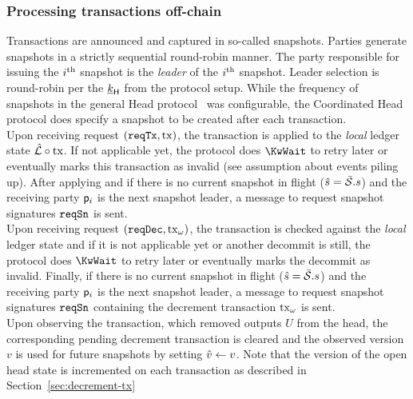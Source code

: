 \subsubsection{Processing transactions off-chain}

Transactions are announced and captured in so-called snapshots. Parties generate
snapshots in a strictly sequential round-robin manner. The party responsible for
issuing the $i^{\text{th}}$ snapshot is the \emph{leader} of the $i^{\text{th}}$ snapshot.
Leader selection is round-robin per the $\underline{k}_{\mathsf{H}}$ from the protocol setup.
While the frequency of snapshots in the general Head protocol~\cite{hydrahead20}
was configurable, the Coordinated Head protocol does specify a snapshot to be
created after each transaction.\\

\quad Upon receiving request $(\mathtt{reqTx},\mathrm{tx})$, the transaction is
applied to the \emph{local} ledger state $\hat {\mathcal L} \circ \mathrm{tx}$. If not
applicable yet, the protocol does $\KwWait$ to retry later or eventually marks
this transaction as invalid (see assumption about events piling up). After
applying and if there is no current snapshot in flight ($\hat s = \bar{\mathcal S}.s$) and the
receiving party $\mathsf p_{i}$ is the next snapshot
leader, a message to request snapshot signatures $\mathtt{reqSn}$ is sent. \\

\quad Upon receiving request $(\mathtt{reqDec},\mathrm{tx}_\omega)$,  the transaction is checked against the \emph{local}
  ledger state and if it is not applicable yet or another decommit is still, the protocol does $\KwWait$ to
  retry later or eventually marks the decommit as invalid.  Finally, if there is no current snapshot in flight
  ($\hat s = \bar{\mathcal S}.s$) and the receiving party $\mathsf p_{i}$ is the next
  snapshot leader, a message to request snapshot signatures $\mathtt{reqSn}$ containing
  the decrement transaction $\mathrm{tx}_\omega$ is sent. \\

\quad Upon observing the \mtxDecrement{}
transaction, which removed outputs $U$ from the head, the corresponding
pending decrement transaction is cleared and the observed version $v$ is used for future
snapshots by setting $\hat v \gets v$.  Note that the version of the open head state
is incremented on each \mtxDecrement{} transaction as described in Section~\ref{sec:decrement-tx}
 \\

